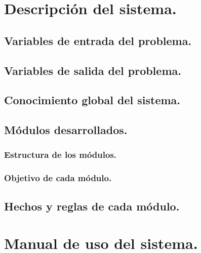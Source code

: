 \documentclass[12pt, spanish]{article}
\begin{document}
\section{Descripción del sistema.}

\subsection{Variables de entrada del problema.}

\subsection{Variables de salida del problema.}

\subsection{Conocimiento global del sistema.}

\subsection{Módulos desarrollados.}

\subsubsection{Estructura de los módulos.}

\subsubsection{Objetivo de cada módulo.}


\subsection{Hechos y reglas de cada módulo.}


\section{Manual de uso del sistema.}
\end{document}
